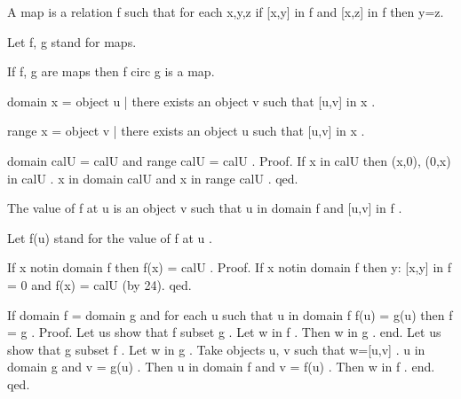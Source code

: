 \documentclass[a4paper,draft]{amsproc}
\begin{document}
\begin{forthel}
\begin{definition}
A map is a relation f such that for each x,y,z if [x,y] in f and [x,z] in f then y=z.
\end{definition}

Let  f, g  stand for maps.

\begin{theorem}
If  f, g  are maps then  f circ g  is a map.
\end{theorem}

\begin{definition}
 domain x = {object u |   there exists an object  v  such that  [u,v] in x} .
\end{definition}

\begin{definition}
 range x = {object v |   there exists an object  u  such that  [u,v] in x} .
\end{definition}

\begin{theorem}
 domain cal{U} = cal{U}  and  range cal{U} = cal{U} .
Proof.
If  x in cal{U}  then  (x,0), (0,x) in cal{U} .
 x in domain cal{U}  and  x in range cal{U} .
qed.
\end{theorem}

\begin{signature}
The value of  f  at  u  is an object  v  such that u in domain f and [u,v] in f .
\end{signature}
Let  f(u)  stand for the value of  f  at  u .

\begin{theorem}
If  x notin domain f  then  f(x) = cal{U} .
Proof.
If  x notin domain f  then  {y: [x,y] in f} = 0  and  f(x) = cal{U}  (by 24).
qed.
\end{theorem}


\begin{theorem}
If  domain f = domain g  and for each u such that u in domain f  f(u) = g(u) then  f = g .
Proof.
Let us show that  f subset g .
Let  w in f . 
Then  w in g . end.
Let us show that  g subset f .
Let  w in g .  
Take objects  u, v  such that  w=[u,v] .
 u in domain g  and  v = g(u) .
Then  u in domain f  and  v = f(u) .
Then  w in f . end.
qed.
\end{theorem}


\end{forthel}
\end{document}
